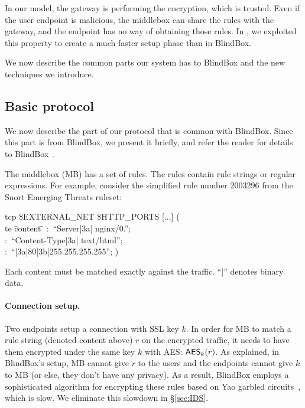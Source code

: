 In our model, the gateway is performing the encryption, which is trusted. Even if the
user endpoint is malicious, the middlebox can share the rules with the gateway, and the
endpoint has no way of obtaining those rules. In \sys, we exploited this property to create a
much faster setup phase than in BlindBox. 




We now describe the common parts our system has to BlindBox and the new techniques we introduce. 





\subsection{Basic protocol}\label{sec:BB}

We now describe the part of our protocol that is common with BlindBox. 
Since this part is from BlindBox, we present it briefly, and refer the reader for details  to BlindBox~\cite{blindbox}.

The middlebox (MB) has a set of rules. The rules contain rule strings or regular expressions. 
For example, consider the  simplified rule number 2003296 from the Snort Emerging Threats ruleset:
%
\begingroup     \fontsize{9pt}{10pt}\selectfont
\begin{tabbing}
 tcp \$EXTERNAL\_NET \$HTTP\_PORTS  [...] ( \\ 
%
%
te \= content \= \kill
\> :\ ``Server|3a| nginx/0.'';  \\
\> :\ ``Content-Type|3a| text/html''; \\
\> :\ ``|3a|80|3b|255.255.255.255''; )
\end{tabbing}
\endgroup

Each content must be matched exactly against the traffic. ``|'' denotes binary data. 

\paragraph{Connection setup.} 
Two endpoints setup a connection with SSL key $k$. 
In order for MB to match a rule string (denoted content above) $r$ on the encrypted traffic, it needs to have them encrypted 
under the same key $k$ with AES: $\mathsf{AES}_k(r)$. 
As explained, in BlindBox's setup, MB cannot give $r$ to the users and the endpoints cannot give $k$ to MB 
(or else, they don't have any privacy). As a result, BlindBox employs a sophisticated algorithm for encrypting
these rules based on Yao garbled circuits~\cite{}, which is slow. We eliminate this slowdown in \S\ref{sec:IDS}.


